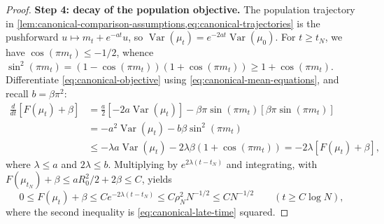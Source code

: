 \begin{proof}
\par\noindent\textbf{Step 4: decay of the population objective.}
The population trajectory in
\cref{lem:canonical-comparison-assumptions,eq:canonical-trajectories}
is the pushforward $u\mapsto m_t+e^{-at}u$, so
$\operatorname{Var}(\mu_t)=e^{-2at}\operatorname{Var}(\mu_0)$.
For $t\ge t_N$, we have $\cos(\pi m_t)\le-1/2$, whence
$\sin^2(\pi m_t)=(1-\cos(\pi m_t))(1+\cos(\pi m_t))
\ge1+\cos(\pi m_t)$.
Differentiate \eqref{eq:canonical-objective} using
\eqref{eq:canonical-mean-equations}, and recall $b=\beta\pi^2$:
\[
 \begin{aligned}
 \frac d{dt}[F(\mu_t)+\beta]
 &=\tfrac a2[-2a\operatorname{Var}(\mu_t)]
   -\beta\pi\sin(\pi m_t)[\beta\pi\sin(\pi m_t)]\\
 &=-a^2\operatorname{Var}(\mu_t)-b\beta\sin^2(\pi m_t)\\
 &\le-\lambda a\operatorname{Var}(\mu_t)
       -2\lambda\beta(1+\cos(\pi m_t))
 =-2\lambda[F(\mu_t)+\beta],
 \end{aligned}
\]
where $\lambda\le a$ and $2\lambda\le b$.
Multiplying by $e^{2\lambda(t-t_N)}$ and integrating, with
$F(\mu_{t_N})+\beta\le aR_0^2/2+2\beta\le C$, yields
\[
 0\le F(\mu_t)+\beta\le Ce^{-2\lambda(t-t_N)}
       \le C\rho_N^2N^{-1/2}\le CN^{-1/2}
       \qquad(t\ge C\log N),
\]
where the second inequality is \eqref{eq:canonical-late-time} squared.
\end{proof}

